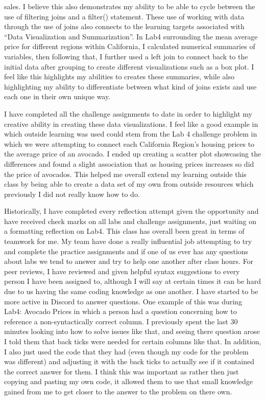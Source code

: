 \documentclass[
  letterpaper,
  DIV=11,
  numbers=noendperiod]{scrartcl}
\begin{document}
sales. I believe this also demonstrates my ability to be able to cycle
between the use of filtering joins and a filter() statement. These use
of working with data through the use of joins also connects to the
learning targets associated with ``Data Visualization and
Summarization''. In Lab4 surrounding the mean average price for
different regions within California, I calculated numerical summaries of
variables, then following that, I further used a left join to connect
back to the initial data after grouping to create different
visualizations such as a box plot. I feel like this highlights my
abilities to creates these summaries, while also highlighting my ability
to differentiate between what kind of joins exists and use each one in
their own unique way.

I have completed all the challenge assignments to date in order to
highlight my creative ability in creating these data visualizations. I
feel like a good example in which outside learning was used could stem
from the Lab 4 challenge problem in which we were attempting to connect
each California Region's housing prices to the average price of an
avocado. I ended up creating a scatter plot showcasing the differences
and found a slight association that as housing prices increases so did
the price of avocados. This helped me overall extend my learning outside
this class by being able to create a data set of my own from outside
resources which previously I did not really know how to do.

Historically, I have completed every reflection attempt given the
opportunity and have received check marks on all labs and challenge
assignments, just waiting on a formatting reflection on Lab4. This class
has overall been great in terms of teamwork for me. My team have done a
really influential job attempting to try and complete the practice
assignments and if one of us ever has any questions about labs we tend
to answer and try to help one another after class hours. For peer
reviews, I have reviewed and given helpful syntax suggestions to every
person I have been assigned to, although I will say at certain times it
can be hard due to us having the same coding knowledge as one another. I
have started to be more active in Discord to answer questions. One
example of this was during Lab4: Avocado Prices in which a person had a
question concerning how to reference a non-syntactically correct column.
I previously spent the last 30 minutes looking into how to solve issues
like that, and seeing there question arose I told them that back ticks
were needed for certain columns like that. In addition, I also just used
the code that they had (even though my code for the problem was
different) and adjusting it with the back ticks to actually see if it
contained the correct answer for them. I think this was important as
rather then just copying and pasting my own code, it allowed them to use
that small knowledge gained from me to get closer to the answer to the
problem on there own.
\end{document}
